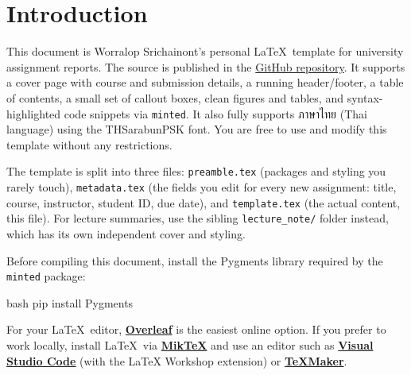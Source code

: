     \tableofcontents
    \thispagestyle{empty}
    \clearpage


    \section{Introduction}

        This document is Worralop Srichainont's personal \LaTeX\ template for university assignment reports.
        The source is published in the \href{https://github.com/reisenx/LATEX-TEMPLATE}{GitHub repository}.
        It supports a cover page with course and submission details, a running header/footer, a table of contents,
        a small set of callout boxes, clean figures and tables, and syntax-highlighted code snippets via \texttt{minted}.
        It also fully supports ภาษาไทย (Thai language) using the THSarabunPSK font.
        You are free to use and modify this template without any restrictions.

        \begin{notebox}
            The template is split into three files: \texttt{preamble.tex} (packages and styling you rarely touch),
            \texttt{metadata.tex} (the fields you edit for every new assignment: title, course, instructor, student ID,
            due date), and \texttt{template.tex} (the actual content, this file). For lecture summaries, use the
            sibling \texttt{lecture\_note/} folder instead, which has its own independent cover and styling.
        \end{notebox}

        \vspace{1em}

        Before compiling this document, install the Pygments library required by the \texttt{minted} package:
        \begin{codeblock}{bash}{}
            pip install Pygments
        \end{codeblock}

        For your \LaTeX\ editor, \href{https://www.overleaf.com/}{\textbf{Overleaf}} is the easiest online option.
        If you prefer to work locally, install \LaTeX\ via \href{https://miktex.org/download}{\textbf{MikTeX}}
        and use an editor such as \href{https://code.visualstudio.com/}{\textbf{Visual Studio Code}} (with the LaTeX Workshop
        extension) or \href{https://www.xm1math.net/texmaker/}{\textbf{TeXMaker}}.

